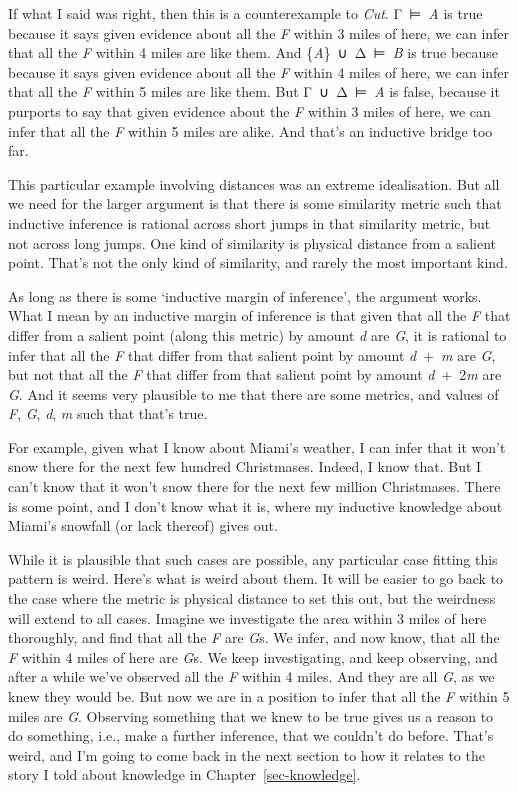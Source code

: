 \documentclass[
  10pt,
  letterpaper,
  twoside]{scrbook}
\begin{document}
If what I said was right, then this is a counterexample to \emph{Cut}.
Γ~⊨~\emph{A} is true because it says given evidence about all the
\emph{F} within 3 miles of here, we can infer that all the \emph{F}
within 4 miles are like them. And \{\emph{A}\}~∪~Δ~⊨~\emph{B} is true
because because it says given evidence about all the \emph{F} within 4
miles of here, we can infer that all the \emph{F} within 5 miles are
like them. But Γ~∪~Δ~⊨~\emph{A} is false, because it purports to say
that given evidence about the \emph{F} within 3 miles of here, we can
infer that all the \emph{F} within 5 miles are alike. And that's an
inductive bridge too far.

This particular example involving distances was an extreme idealisation.
But all we need for the larger argument is that there is some similarity
metric such that inductive inference is rational across short jumps in
that similarity metric, but not across long jumps. One kind of
similarity is physical distance from a salient point. That's not the
only kind of similarity, and rarely the most important kind.

As long as there is some `inductive margin of inference', the argument
works. What I mean by an inductive margin of inference is that given
that all the \emph{F} that differ from a salient point (along this
metric) by amount \emph{d} are \emph{G}, it is rational to infer that
all the \emph{F} that differ from that salient point by amount
\emph{d}~+~\emph{m} are \emph{G}, but not that all the \emph{F} that
differ from that salient point by amount \emph{d}~+~2\emph{m} are
\emph{G}. And it seems very plausible to me that there are some metrics,
and values of \emph{F}, \emph{G}, \emph{d}, \emph{m} such that that's
true.

For example, given what I know about Miami's weather, I can infer that
it won't snow there for the next few hundred Christmases. Indeed, I know
that. But I can't know that it won't snow there for the next few million
Christmases. There is some point, and I don't know what it is, where my
inductive knowledge about Miami's snowfall (or lack thereof) gives out.

While it is plausible that such cases are possible, any particular case
fitting this pattern is weird. Here's what is weird about them. It will
be easier to go back to the case where the metric is physical distance
to set this out, but the weirdness will extend to all cases. Imagine we
investigate the area within 3 miles of here thoroughly, and find that
all the \emph{F} are \emph{G}s. We infer, and now know, that all the
\emph{F} within 4 miles of here are \emph{G}s. We keep investigating,
and keep observing, and after a while we've observed all the \emph{F}
within 4 miles. And they are all \emph{G}, as we knew they would be. But
now we are in a position to infer that all the \emph{F} within 5 miles
are \emph{G}. Observing something that we knew to be true gives us a
reason to do something, i.e., make a further inference, that we couldn't
do before. That's weird, and I'm going to come back in the next section
to how it relates to the story I told about knowledge in
Chapter~\ref{sec-knowledge}.
\end{document}
